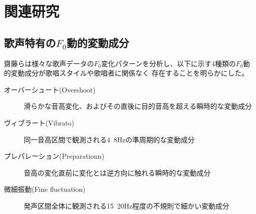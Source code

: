 \documentclass[10ptj,a4j,dvipdfmx,uplatex, oneside, openany]{jsbook}%
\begin{document}

\chapter{関連研究}

\section{歌声特有の$F_0$動的変動成分}
齋藤らは様々な歌声データの$F_0$変化パターンを分析し、以下に示す4種類の$F_0$動的変動成分が歌唱スタイルや歌唱者に関係なく
存在することを明らかにした。\cite{singbyspeaking}
\begin{description}
    \item[オーバーシュート(Overshoot)]滑らかな音高変化、およびその直後に目的音高を超える瞬時的な変動成分
    \item[ヴィブラート(Vibrato)]同一音高区間で観測される4~8Hzの準周期的な変動成分
    \item[プレパレーション(Preparationn)]音高の変化直前に変化とは逆方向に触れる瞬時的な変動成分
    \item[微細振動(Fine fluctuation)] 発声区間全体に観測される15~20Hz程度の不規則で細かい変動成分
\end{description}
\end{document}
